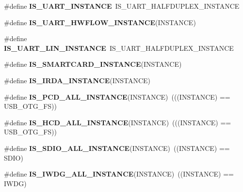 \begin{DoxyCompactItemize}
\#define {\bfseries I\+S\+\_\+\+U\+A\+R\+T\+\_\+\+I\+N\+S\+T\+A\+N\+CE}~I\+S\+\_\+\+U\+A\+R\+T\+\_\+\+H\+A\+L\+F\+D\+U\+P\+L\+E\+X\+\_\+\+I\+N\+S\+T\+A\+N\+CE
\item 
\#define {\bfseries I\+S\+\_\+\+U\+A\+R\+T\+\_\+\+H\+W\+F\+L\+O\+W\+\_\+\+I\+N\+S\+T\+A\+N\+CE}(I\+N\+S\+T\+A\+N\+CE)
\item 
\mbox{\label{group___exported__macros_gaf7905bb5a02acf0e92ddf40bdd8dcdc0}} 
\#define {\bfseries I\+S\+\_\+\+U\+A\+R\+T\+\_\+\+L\+I\+N\+\_\+\+I\+N\+S\+T\+A\+N\+CE}~I\+S\+\_\+\+U\+A\+R\+T\+\_\+\+H\+A\+L\+F\+D\+U\+P\+L\+E\+X\+\_\+\+I\+N\+S\+T\+A\+N\+CE
\item 
\#define {\bfseries I\+S\+\_\+\+S\+M\+A\+R\+T\+C\+A\+R\+D\+\_\+\+I\+N\+S\+T\+A\+N\+CE}(I\+N\+S\+T\+A\+N\+CE)
\item 
\#define {\bfseries I\+S\+\_\+\+I\+R\+D\+A\+\_\+\+I\+N\+S\+T\+A\+N\+CE}(I\+N\+S\+T\+A\+N\+CE)
\item 
\mbox{\label{group___exported__macros_gadaf663c55446f04fa69ee912b8890b32}} 
\#define {\bfseries I\+S\+\_\+\+P\+C\+D\+\_\+\+A\+L\+L\+\_\+\+I\+N\+S\+T\+A\+N\+CE}(I\+N\+S\+T\+A\+N\+CE)~(((I\+N\+S\+T\+A\+N\+CE) == U\+S\+B\+\_\+\+O\+T\+G\+\_\+\+FS))
\item 
\mbox{\label{group___exported__macros_ga6696ebd1aea007a19e831517f3e1f497}} 
\#define {\bfseries I\+S\+\_\+\+H\+C\+D\+\_\+\+A\+L\+L\+\_\+\+I\+N\+S\+T\+A\+N\+CE}(I\+N\+S\+T\+A\+N\+CE)~(((I\+N\+S\+T\+A\+N\+CE) == U\+S\+B\+\_\+\+O\+T\+G\+\_\+\+FS))
\item 
\mbox{\label{group___exported__macros_ga73932cb2c83be6be1884d3cba2fc0063}} 
\#define {\bfseries I\+S\+\_\+\+S\+D\+I\+O\+\_\+\+A\+L\+L\+\_\+\+I\+N\+S\+T\+A\+N\+CE}(I\+N\+S\+T\+A\+N\+CE)~((I\+N\+S\+T\+A\+N\+CE) == S\+D\+IO)
\item 
\mbox{\label{group___exported__macros_gad9ec4c52f0572ee67d043e006f1d5e39}} 
\#define {\bfseries I\+S\+\_\+\+I\+W\+D\+G\+\_\+\+A\+L\+L\+\_\+\+I\+N\+S\+T\+A\+N\+CE}(I\+N\+S\+T\+A\+N\+CE)~((I\+N\+S\+T\+A\+N\+CE) == I\+W\+DG)
\item 
\mbox{\label{group___exported__macros_gac2a8aaec233e19987232455643a04d6f}} 

\end{DoxyCompactItemize}
